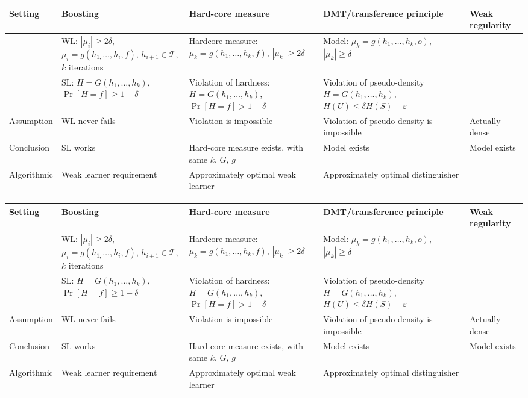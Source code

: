 \noindent
\begin{tabular}{|p{20mm}|p{35mm}|p{35mm}|p{35mm}|p{15mm}|}
\hline 
Setting & Boosting & Hard-core measure & DMT/transference principle & Weak regularity\\

\hline 
 & WL: $|\mu_{i}|\ge2\delta$, $\mu_{i}=g(h_{1,}\ldots,h_{i},f)$, $h_{i+1}\in\mathcal{T}$, $k$
iterations & Hardcore measure: $\mu_{k}=g(h_{1},\ldots,h_{k},f)$, $|\mu_{k}|\ge2\delta$ & Model: $\mu_{k}=g(h_{1},\ldots,h_{k},o)$, $|\mu_{k}|\ge\delta$& \\ 
\hline 
 & SL: $H=G(h_{1},\ldots,h_{k})$, $\Pr[H=f]\ge1-\delta$ & Violation of hardness: $H=G(h_{1},\ldots,h_{k})$, $\Pr[H=f]>1-\delta$ & Violation of pseudo-density $H=G(h_{1},\ldots,h_{k})$, $H(U)\le\delta H(S)-\varepsilon$& 
 \\
\hline 
Assumption & WL never fails & Violation is impossible & Violation of pseudo-density is impossible
& Actually dense \\
\hline 
Conclusion & SL works & Hard-core measure exists, with same $k$, $G$, $g$ & Model exists & Model exists
\\
\hline 
Algorithmic & Weak learner requirement & Approximately optimal weak learner & Approximately optimal distinguisher & \\
\hline 
\end{tabular}

\noindent
\begin{tabular}{|p{20mm}|p{35mm}|p{35mm}|p{35mm}|p{15mm}|}
\hline 
Setting & Boosting & Hard-core measure & DMT/transference principle & Weak regularity\\

\hline 
 & WL: $|\mu_{i}|\ge2\delta$, $\mu_{i}=g(h_{1,}\ldots,h_{i},f)$, $h_{i+1}\in\mathcal{T}$, $k$
iterations & Hardcore measure: $\mu_{k}=g(h_{1},\ldots,h_{k},f)$, $|\mu_{k}|\ge2\delta$ & Model: $\mu_{k}=g(h_{1},\ldots,h_{k},o)$, $|\mu_{k}|\ge\delta$& \\ 
\hline 
 & SL: $H=G(h_{1},\ldots,h_{k})$, $\Pr[H=f]\ge1-\delta$ & Violation of hardness: $H=G(h_{1},\ldots,h_{k})$, $\Pr[H=f]>1-\delta$ & Violation of pseudo-density $H=G(h_{1},\ldots,h_{k})$, $H(U)\le\delta H(S)-\varepsilon$& 
 \\
\hline 
Assumption & WL never fails & Violation is impossible & Violation of pseudo-density is impossible
& Actually dense \\
\hline 
Conclusion & SL works & Hard-core measure exists, with same $k$, $G$, $g$ & Model exists & Model exists
\\
\hline 
Algorithmic & Weak learner requirement & Approximately optimal weak learner & Approximately optimal distinguisher & \\
\hline 
\end{tabular}


